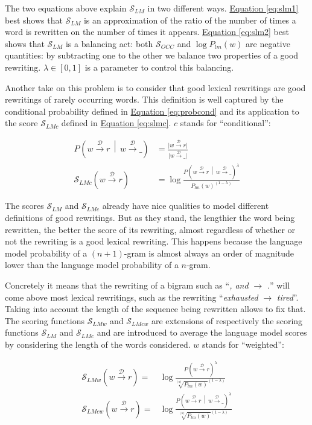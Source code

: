 \documentclass[a4paper, 11pt, onepage]{scrreprt}
\newcommand\equaref[1]{\hyperref[#1]{Equation \ref*{#1}}}
\newcommand\maps[1]{\xrightarrow{\mathcal{#1}}}
\newcommand\card[1]{\lvert #1 \rvert}
\newcommand\given{\, \middle| \,}
\newcommand\proba[2][]{P_{#1} \left( #2 \right)}
\begin{document}
The two equations above explain $\mathcal{S}_{LM}$ in two different
ways. \equaref{eq:slm1} best shows that $\mathcal{S}_{LM}$ is an
approximation of the ratio of the number of times a word is rewritten
on the number of times it appears. \equaref{eq:slm2} best shows that
$\mathcal{S}_{LM}$ is a balancing act: both $\mathcal{S}_{OCC}$ and
$\log \proba[lm]{w}$ are negative quantities: by subtracting one to
the other we balance two properties of a good rewriting. $\lambda \in
\left[0,1\right]$ is a parameter to control this balancing.

Another take on this problem is to consider that good lexical
rewritings are good rewritings of rarely occurring words. This
definition is well captured by the conditional probability defined in
\equaref{eq:probcond} and its application to the score
$\mathcal{S}_{LMc}$ defined in \equaref{eq:slmc}. $c$ stands for
“conditional”:

\begin{align}
  \label{eq:probcond}
  \proba{w \maps{D} r \given w \maps{D} \_} & = \frac%
  {\card{w \maps{D} r}}%
  {\card{w \maps{D} \_}} \\
  \label{eq:slmc}
  \mathcal{S}_{LMc}(w \maps{D} r) & = \log \frac%
  {\proba{w \maps{D} r \given w \maps{D} \_}^\lambda}%
  {\proba[lm]{w}^{(1 - \lambda)}}
\end{align}

The scores $\mathcal{S}_{LM}$ and $\mathcal{S}_{LMc}$ already have
nice qualities to model different definitions of good rewritings. But
as they stand, the lengthier the word being rewritten, the better the
score of its rewriting, almost regardless of whether or not the
rewriting is a good lexical rewriting. This happens because the
language model probability of a $(n+1)$-gram is almost always an order
of magnitude lower than the language model probability of a
$n$-gram.

Concretely it means that the rewriting of a bigram such as “\emph{,
  and} $\rightarrow$ \emph{.}”  will come above most lexical
rewritings, such as the rewriting “\emph{exhausted} $\rightarrow$
\emph{tired}”. Taking into account the length of the sequence being
rewritten allows to fix that. The scoring functions
$\mathcal{S}_{LMw}$ and $\mathcal{S}_{LMcw}$ are extensions of
respectively the scoring functions $\mathcal{S}_{LM}$ and
$\mathcal{S}_{LMc}$ and are introduced to average the language model
scores by considering the length of the words considered. $w$ stands
for “weighted”:

\begin{align}
  \label{eq:slmw}
  \mathcal{S}_{LMw}(w \maps{D} r) = & \log \frac%
  {\proba{w \maps{D} r}^\lambda}%
  {\sqrt[\card{w}]{\proba[lm]{w}}^{(1 - \lambda)}} \\
  \label{eq:slmcw}
  \mathcal{S}_{LMcw}(w \maps{D} r) = & \log \frac%
  {\proba{w \maps{D} r \given w \maps{D} \_}^\lambda}%
  {\sqrt[\card{w}]{\proba[lm]{w}}^{(1 - \lambda)}} \\
\end{align}
\end{document}
